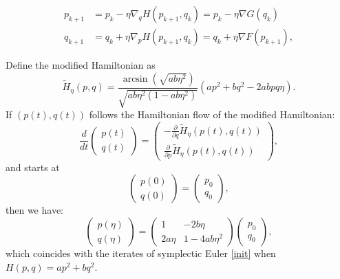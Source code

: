 \documentclass[10pt,a4paper]{amsart}
\begin{document}
\begin{subequations}\label{init}
\begin{align}
        p_{k+1} &=p_{k}-\eta \nabla_{q}H\left(p_{k+1},q_{k}\right)= p_{k}-\eta\nabla G\left(q_{k}\right) \label{Eq:SymEuler-p} \\ 
        q_{k+1} &=q_{k}+\eta\nabla_{p}H\left(p_{k+1},q_{k}\right)= q_{k}+\eta\nabla F\left(p_{k+1}\right), \label{Eq:SymEuler-q}
\end{align}
\end{subequations}

\begin{lemma}
    Define the modified Hamiltonian as $$
    \tilde H_\eta(p,q) = \frac{\arcsin(\sqrt{ab\eta^2})}{\sqrt{ab\eta^2(1-ab\eta^2)}} (ap^2+bq^2-2abpq\eta).
    $$
    If $\left(p(t), q(t)\right)$ follows the Hamiltonian flow of the modified Hamiltonian:
    $$
    \frac{d}{dt}
    \begin{pmatrix}
        p(t)\\q(t)
    \end{pmatrix}=
    \begin{pmatrix}
        -\frac{\partial }{\partial q}\widetilde{H}_{\eta}(p(t), q(t))\\
        \frac{\partial }{\partial p}\widetilde{H}_{\eta}(p(t), q(t))
    \end{pmatrix},
    $$
    and starts at $$
    \begin{pmatrix}
        p(0) \\ q(0)
    \end{pmatrix}=\begin{pmatrix}
        p_0 \\ q_0
    \end{pmatrix},
    $$ then we have:
    $$
    \begin{pmatrix}
        p(\eta)\\q(\eta)
    \end{pmatrix}=\begin{pmatrix}
        1 & - 2b\eta \\
        2a \eta & 1-4ab \eta^2
    \end{pmatrix}
    \begin{pmatrix}
        p_0 \\ q_0
    \end{pmatrix},
    $$
    which coincides with the iterates of symplectic Euler \eqref{init} when $H(p, q)=ap^2+bq^2$.
\end{lemma}
\end{document}
